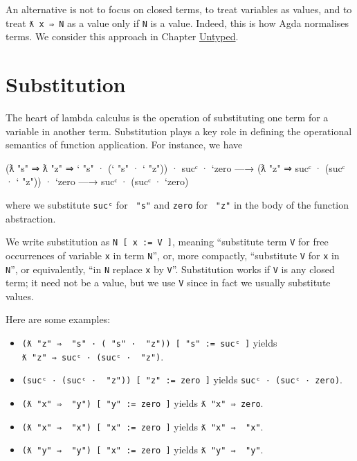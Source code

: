 An alternative is not to focus on closed terms, to treat variables as
values, and to treat \texttt{ƛ\ x\ ⇒\ N} as a value only if \texttt{N}
is a value. Indeed, this is how Agda normalises terms. We consider this
approach in Chapter \protect\hyperlink{Untyped}{Untyped}.

\hypertarget{substitution}{%
\section{Substitution}\label{substitution}}

The heart of lambda calculus is the operation of substituting one term
for a variable in another term. Substitution plays a key role in
defining the operational semantics of function application. For
instance, we have

\begin{myDisplay}
  (ƛ "s" ⇒ ƛ "z" ⇒ ` "s" · (` "s" · ` "z")) · sucᶜ · `zero
—→
  (ƛ "z" ⇒ sucᶜ · (sucᶜ · ` "z")) · `zero
—→
  sucᶜ · (sucᶜ · `zero)
\end{myDisplay}

where we substitute \texttt{sucᶜ} for \texttt{\textasciigrave{}\ "s"}
and \texttt{\textasciigrave{}zero} for \texttt{\textasciigrave{}\ "z"}
in the body of the function abstraction.

We write substitution as \texttt{N\ {[}\ x\ :=\ V\ {]}}, meaning
``substitute term \texttt{V} for free occurrences of variable \texttt{x}
in term \texttt{N}'', or, more compactly, ``substitute \texttt{V} for
\texttt{x} in \texttt{N}'', or equivalently, ``in \texttt{N} replace
\texttt{x} by \texttt{V}''. Substitution works if \texttt{V} is any
closed term; it need not be a value, but we use \texttt{V} since in fact
we usually substitute values.

Here are some examples:

\begin{itemize}
\tightlist
\item
  \texttt{(ƛ\ "z"\ ⇒\ \textasciigrave{}\ "s"\ ·\ (\textasciigrave{}\ "s"\ ·\ \textasciigrave{}\ "z"))\ {[}\ "s"\ :=\ sucᶜ\ {]}}
  yields \texttt{ƛ\ "z"\ ⇒\ sucᶜ\ ·\ (sucᶜ\ ·\ \textasciigrave{}\ "z")}.
\item
  \texttt{(sucᶜ\ ·\ (sucᶜ\ ·\ \textasciigrave{}\ "z"))\ {[}\ "z"\ :=\ \textasciigrave{}zero\ {]}}
  yields \texttt{sucᶜ\ ·\ (sucᶜ\ ·\ \textasciigrave{}zero)}.
\item
  \texttt{(ƛ\ "x"\ ⇒\ \textasciigrave{}\ "y")\ {[}\ "y"\ :=\ \textasciigrave{}zero\ {]}}
  yields \texttt{ƛ\ "x"\ ⇒\ \textasciigrave{}zero}.
\item
  \texttt{(ƛ\ "x"\ ⇒\ \textasciigrave{}\ "x")\ {[}\ "x"\ :=\ \textasciigrave{}zero\ {]}}
  yields \texttt{ƛ\ "x"\ ⇒\ \textasciigrave{}\ "x"}.
\item
  \texttt{(ƛ\ "y"\ ⇒\ \textasciigrave{}\ "y")\ {[}\ "x"\ :=\ \textasciigrave{}zero\ {]}}
  yields \texttt{ƛ\ "y"\ ⇒\ \textasciigrave{}\ "y"}.
\end{itemize}


